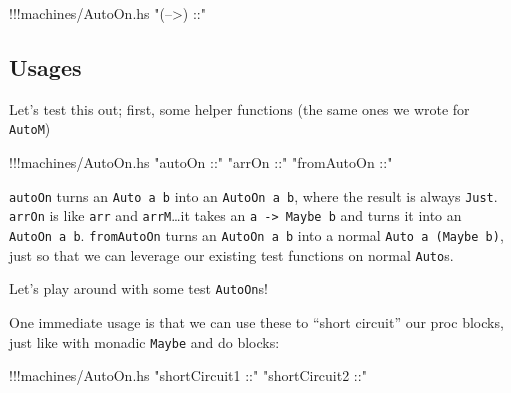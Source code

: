 \documentclass[]{article}
\newenvironment{Shaded}{}{}
\newcommand{\StringTok}[1]{\textcolor[rgb]{0.25,0.44,0.63}{{#1}}}
\newcommand{\CommentTok}[1]{\textcolor[rgb]{0.38,0.63,0.69}{\textit{{#1}}}}
\newcommand{\FunctionTok}[1]{\textcolor[rgb]{0.02,0.16,0.49}{{#1}}}
\newcommand{\NormalTok}[1]{{#1}}
\begin{document}
\begin{Shaded}
\begin{Highlighting}[]
\FunctionTok{!!!}\NormalTok{machines}\FunctionTok{/}\NormalTok{AutoOn.hs }\StringTok{"(-->) ::"}
\end{Highlighting}
\end{Shaded}

\subsection{Usages}\label{usages}

Let's test this out; first, some helper functions (the same ones we
wrote for \texttt{AutoM})

\begin{Shaded}
\begin{Highlighting}[]
\FunctionTok{!!!}\NormalTok{machines}\FunctionTok{/}\NormalTok{AutoOn.hs }\StringTok{"autoOn ::"} \StringTok{"arrOn ::"} \StringTok{"fromAutoOn ::"}
\end{Highlighting}
\end{Shaded}

\texttt{autoOn} turns an \texttt{Auto\ a\ b} into an
\texttt{AutoOn\ a\ b}, where the result is always \texttt{Just}.
\texttt{arrOn} is like \texttt{arr} and \texttt{arrM}\ldots{}it takes an
\texttt{a\ -\textgreater{}\ Maybe\ b} and turns it into an
\texttt{AutoOn\ a\ b}. \texttt{fromAutoOn} turns an
\texttt{AutoOn\ a\ b} into a normal \texttt{Auto\ a\ (Maybe\ b)}, just
so that we can leverage our existing test functions on normal
\texttt{Auto}s.

Let's play around with some test \texttt{AutoOn}s!

\begin{Shaded}
\end{Shaded}

One immediate usage is that we can use these to ``short circuit'' our
proc blocks, just like with monadic \texttt{Maybe} and do blocks:

\begin{Shaded}
\begin{Highlighting}[]
\FunctionTok{!!!}\NormalTok{machines}\FunctionTok{/}\NormalTok{AutoOn.hs }\StringTok{"shortCircuit1 ::"} \StringTok{"shortCircuit2 ::"}
\end{Highlighting}
\end{Shaded}
\end{document}
